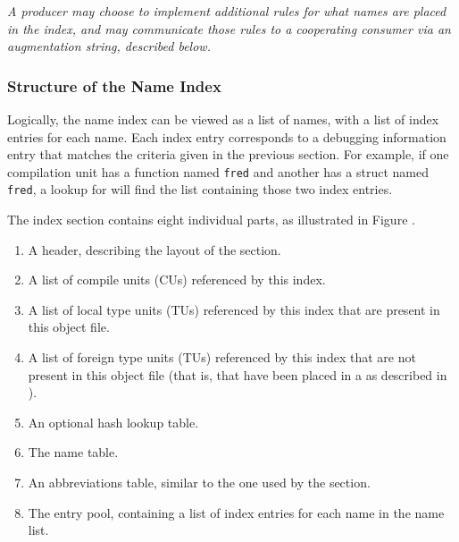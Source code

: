 \textit{A producer may choose to implement additional rules for what
names are placed in the index, and may communicate those rules to
a cooperating consumer via an augmentation string, described
below.}

\subsubsection{Structure of the Name Index}
\label{chap:structureofthenametindex}
Logically, the name index can be viewed as a list of names, 
with a list of index entries for each name. Each index entry 
corresponds to a debugging information entry 
that matches the criteria given in the previous section. For
example, if one compilation unit has a function named \texttt{fred} 
and another has a struct named \texttt{fred}, a lookup for 
 will find the list containing those two index 
entries.

The index section contains eight individual parts, as illustrated in 
Figure .
\begin{enumerate}
\item A header, describing the layout of the section.

\item A list of compile units (CUs) referenced by this index.

\item A list of local type units (TUs) referenced by this index
    that are present in this object file.

\item A list of foreign type units (TUs) referenced by this index
    that are not present in this object file (that is, that have
    been placed in a \splitDWARFobjectfile{} as described in
    ).

\item An optional hash lookup table.

\item The name table.

\item An abbreviations table, similar to the one used by the
    \dotdebuginfo{} section.

\item The entry pool, containing a list of index entries for each
    name in the name list.
\end{enumerate}

